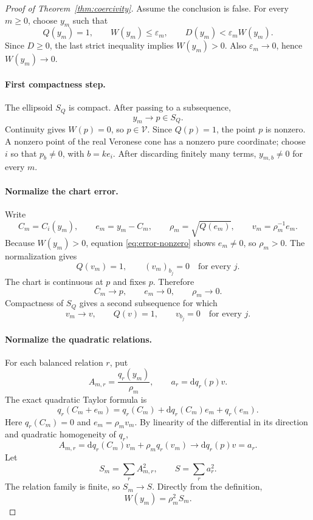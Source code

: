 \documentclass[11pt]{article}
\theoremstyle{definition}
\theoremstyle{remark}
\newcommand{\V}{\mathcal V}
\newcommand{\dd}{\mathrm d}
\begin{document}
\begin{proof}[Proof of Theorem~\ref{thm:coercivity}]
Assume the conclusion is false.  For every \(m\geq0\), choose \(y_m\)
such that
\[
  Q(y_m)=1,\qquad
  W(y_m)\leq\varepsilon_m,\qquad
  D(y_m)<\varepsilon_m W(y_m).
  \tag{5}\label{eq:bad}
\]
Since \(D\geq0\), the last strict inequality implies \(W(y_m)>0\).
Also \(\varepsilon_m\to0\), hence \(W(y_m)\to0\).

\paragraph{First compactness step.}
The ellipsoid \(S_Q\) is compact.  After passing to a subsequence,
\[
  y_m\longrightarrow p\in S_Q.
\]
Continuity gives \(W(p)=0\), so \(p\in\V\).  Since \(Q(p)=1\), the point
\(p\) is nonzero.  A nonzero point of the real Veronese cone has a
nonzero pure coordinate; choose \(i\) so that \(p_b\neq0\), with
\(b=ke_i\).  After discarding finitely many terms, \(y_{m,b}\neq0\) for
every \(m\).

\paragraph{Normalize the chart error.}
Write
\[
  C_m=C_i(y_m),\qquad e_m=y_m-C_m,\qquad
  \rho_m=\sqrt{Q(e_m)},\qquad v_m=\rho_m^{-1}e_m.
  \tag{6}\label{eq:normalize}
\]
Because \(W(y_m)>0\), equation \eqref{eq:error-nonzero} shows
\(e_m\neq0\), so \(\rho_m>0\).  The normalization gives
\[
  Q(v_m)=1,\qquad (v_m)_{b_j}=0\quad\text{for every }j.
  \tag{7}\label{eq:normalized-properties}
\]
The chart is continuous at \(p\) and fixes \(p\).  Therefore
\[
  C_m\to p,\qquad e_m\to0,\qquad \rho_m\to0.
\]
Compactness of \(S_Q\) gives a second subsequence for which
\[
  v_m\longrightarrow v,\qquad
  Q(v)=1,\qquad v_{b_j}=0\quad\text{for every }j.
  \tag{8}\label{eq:v-limit}
\]

\paragraph{Normalize the quadratic relations.}
For each balanced relation \(r\), put
\[
  A_{m,r}=\frac{q_r(y_m)}{\rho_m},
  \qquad
  a_r=\dd q_r(p)v.
\]
The exact quadratic Taylor formula is
\[
  q_r(C_m+e_m)
   =q_r(C_m)+\dd q_r(C_m)e_m+q_r(e_m).
\]
Here \(q_r(C_m)=0\) and \(e_m=\rho_m v_m\).  By linearity of the
differential in its direction and quadratic homogeneity of \(q_r\),
\[
  A_{m,r}
   =\dd q_r(C_m)v_m+\rho_m q_r(v_m)
   \longrightarrow \dd q_r(p)v=a_r.
  \tag{9}\label{eq:A-limit}
\]
Let
\[
  S_m=\sum_r A_{m,r}^2,\qquad S=\sum_r a_r^2.
\]
The relation family is finite, so \(S_m\to S\).  Directly from the
definition,
\[
  W(y_m)=\rho_m^2S_m.
  \tag{10}\label{eq:W-factor}
\]


\end{proof}
\end{document}
